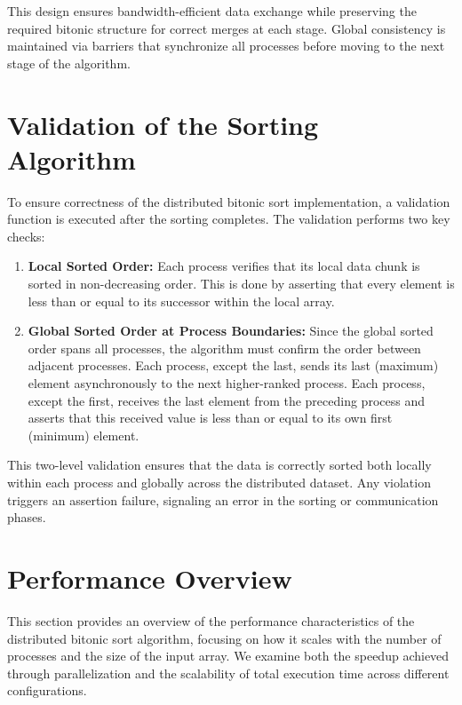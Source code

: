 \documentclass{article}
\begin{document}
This design ensures bandwidth-efficient data exchange while preserving the required bitonic structure for 
correct merges at each stage. Global consistency is maintained via barriers that synchronize all processes 
before moving to the next stage of the algorithm.

\section{Validation of the Sorting Algorithm}

To ensure correctness of the distributed bitonic sort implementation, a validation function 
is executed after the sorting completes. The validation performs two key checks:

\begin{enumerate}
    \item \textbf{Local Sorted Order:} Each process verifies that its local data chunk is sorted 
    in non-decreasing order. This is done by asserting that every element is less than or equal to 
    its successor within the local array.
    
    \item \textbf{Global Sorted Order at Process Boundaries:} Since the global sorted order spans 
    all processes, the algorithm must confirm the order between adjacent processes. Each process, 
    except the last, sends its last (maximum) element asynchronously to the next higher-ranked process. 
    Each process, except the first, receives the last element from the preceding process and asserts 
    that this received value is less than or equal to its own first (minimum) element.
\end{enumerate}

This two-level validation ensures that the data is correctly sorted both locally within each process 
and globally across the distributed dataset. Any violation triggers an assertion failure, signaling 
an error in the sorting or communication phases.

\section{Performance Overview}

This section provides an overview of the performance characteristics of the distributed bitonic sort algorithm,
focusing on how it scales with the number of processes and the size of the input array. We examine both the 
speedup achieved through parallelization and the scalability of total execution time across different 
configurations.
\end{document}
